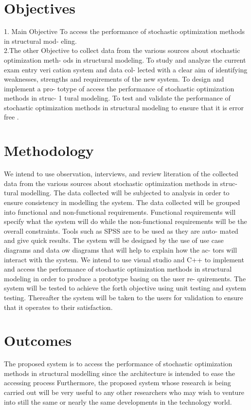 \documentclass[12pt]{report}
\begin{document}
\section{Objectives}
{1. Main Objective To access the performance of stochastic optimization methods
	in structural mod- eling.\\ 2.The other Objective to collect data from the various
	sources about stochastic optimization meth- ods in structural modeling. To
	study and analyze the current exam entry veri
	cation system and data col- lected with a clear aim of identifying weaknesses,
	strengths and requirements of the new system. To design and implement a pro-
	totype of access the performance of stochastic optimization methods in struc-
	1
	tural modeling. To test and validate the performance of stochastic optimization
	methods in structural modeling to ensure that it is error free .}
\section{Methodology}
{We intend to use observation, interviews, and review literation of the collected
	data from the various sources about stochastic optimization methods in struc-
	tural modelling. The data collected will be subjected to analysis in order to
	ensure consistency in modelling the system. The data collected will be grouped
	into functional and non-functional requirements. Functional requirements will
	specify what the system will do while the non-functional requirements will be
	the overall constraints. Tools such as SPSS are to be used as they are auto-
	mated and give quick results. The system will be designed by the use of use
	case diagrams and data ow diagrams that will help to explain how the ac-
	tors will interact with the system. We intend to use visual studio and C++
	to implement and access the performance of stochastic optimization methods
	in structural modeling in order to produce a prototype basing on the user re-
	quirements. The system will be tested to achieve the forth objective using unit
	testing and system testing. Thereafter the system will be taken to the users for
	validation to ensure that it operates to their satisfaction.}
\section{Outcomes}
{The proposed system is to access the performance of stochastic optimization
	methods in structural modelling since the architecture is intended to ease the
	accessing process Furthermore, the proposed system whose research is being
	carried out will be very useful to any other researchers who may wish to venture
	into still the same or nearly the same developments in the technology world.}
\end{document}
